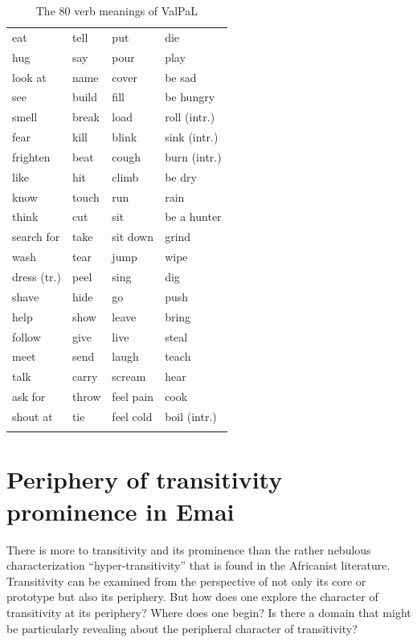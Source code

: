 \documentclass[output=paper,colorlinks,citecolor=brown
]{langscibook}
\begin{document}
\begin{table}
\caption{The 80 verb meanings of ValPaL}
\label{tab:schaefer:frequencies}
 \begin{tabularx}{.6\textwidth}{llll}
  \lsptoprule
eat  &   tell  &    put  &    die\\
hug  &   say  &    pour  &    play\\
look at  &   name  &    cover  &    be sad\\
see  &   build   &    fill  &    be hungry\\
smell  &  break   &    load  &    roll (intr.)\\
fear  &  kill    &    blink  &    sink (intr.)\\
frighten  &  beat   &    cough  &    burn (intr.)\\
like  &   hit  &    climb  &    be dry\\
know  &   touch  &    run  &    rain\\
think  &   cut  &    sit  &    be a hunter\\
search for  &   take  &    sit down  &    grind\\
wash  &   tear  &    jump  &    wipe\\
dress (tr.)  &   peel  &    sing  &    dig\\
shave  &   hide  &    go  &    push\\
help  &   show  &    leave  &    bring\\
follow  &   give  &    live  &    steal\\
meet  &   send  &    laugh  &    teach\\
talk  &   carry  &    scream  &    hear\\
ask for  &   throw  &    feel pain  &    cook\\
shout at  &   tie  &    feel cold  &    boil (intr.)\\
  \lspbottomrule
 \end{tabularx}
\end{table}

\section{Periphery of transitivity prominence in Emai}

There is more to transitivity and its prominence than the rather nebulous characterization “hyper-transitivity” that is found in the Africanist literature. Transitivity can be examined from the perspective of not only its core or prototype but also its periphery. But how does one explore the character of transitivity at its periphery? Where does one begin? Is there a domain that might be particularly revealing about the peripheral character of transitivity?  
\end{document}
